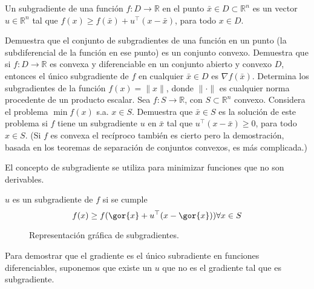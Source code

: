 \begin{problem}[10]

Un subgradiente de una función $f:D\to\mathbb{R}$ en el punto $\bar{x}\in D\subset \mathbb{R}^n$ es un vector $u\in\mathbb{R}^n$ tal que $f(x)\geq f(\bar{x}) + u^\top (x-\bar{x})$, para todo $x\in D$. 

\ppart Demuestra que el conjunto de subgradientes de una función en un punto (la subdiferencial de la función en ese punto) es un conjunto convexo. 
\ppart Demuestra que si $f:D\to\mathbb{R}$ es convexa y diferenciable en un conjunto abierto y convexo $D$, entonces el único subgradiente de $f$ en cualquier $\bar{x}\in D$ es $\nabla f(\bar{x})$.
\ppart Determina los subgradientes de la función $f(x)=\|x\|$, donde $\|\cdot\|$ es cualquier norma procedente de un producto escalar.
\ppart Sea $f:S\to \mathbb{R}$, con $S\subset\mathbb{R}^n$ convexo. Considera el problema $\min f(x)$ s.a. $x\in S$. Demuestra que $\bar{x}\in S$ es la solución de este problema si $f$ tiene un subgradiente $u$ en $\bar{x}$ tal que $u^\top (x-\bar{x})\geq 0$, para todo $x\in S$. (Si $f$ es convexa el recíproco también es cierto pero la demostración, basada en los teoremas de separación de conjuntos convexos, es más complicada.)  

\obs El concepto de subgradiente se utiliza para minimizar funciones que no son derivables.

\solution

\begin{defn}[Subgradiente]
$u$ es un subgradiente de $f$ si se cumple \[f(x) \geq f(\gor{x} + u^\top (x-\gor{x})) \forall x\in S\]
\end{defn}

\begin{figure}[hbtp]
\centering
{}
\caption{Representación gráfica de subgradientes.}
\end{figure}

\spart

\spart

Para demostrar que el gradiente es el único subradiente en funciones diferenciables, suponemos que existe un $u$ que no es el gradiente tal que es subgradiente.


\end{problem}
